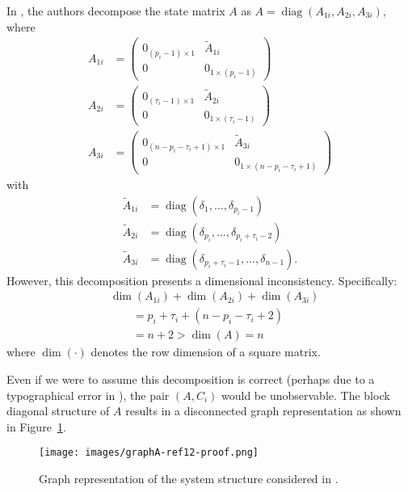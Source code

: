 \documentclass[journal]{IEEEtran}
\newcommand{\diag}{\operatorname{diag}}	%
\begin{document}
In \cite[Appendix C]{Chang2021}, the authors decompose the state matrix $A$ as $A=\diag(A_{1i},A_{2i},A_{3i})$, where
\begin{align*}
    A_{1i} &= \begin{pmatrix}
        0_{(p_i-1)\times 1} & \tilde{A}_{1i} \\ 0 & 0_{1\times (p_i-1)}
    \end{pmatrix} \\
    A_{2i} &= \begin{pmatrix}
        0_{(\tau_i-1)\times 1} & \tilde{A}_{2i} \\ 0 & 0_{1\times(\tau_i-1)}
    \end{pmatrix} \\
    A_{3i} &= \begin{pmatrix}
        0_{(n-p_i-\tau_i+1)\times 1} & \tilde{A}_{3i} \\ 0 & 0_{1\times (n-p_i-\tau_i+1)}
    \end{pmatrix}
\end{align*}
with 
\begin{align*}
    \tilde{A}_{1i} &= \diag(\delta_1,\dots,\delta_{p_i-1}) \\
    \tilde{A}_{2i} &= \diag(\delta_{p_i},\dots,\delta_{p_i+\tau_i-2}) \\
    \tilde{A}_{3i} &= \diag(\delta_{p_i+\tau_i-1},\dots,\delta_{n-1}).
\end{align*}
However, this decomposition presents a dimensional inconsistency. Specifically:
\begin{align*}
&\dim(A_{1i}) + \dim(A_{2i}) + \dim(A_{3i}) \\ &\qquad = p_i + \tau_i + (n-p_i-\tau_i+2) \\
& \qquad = n+2 > \dim(A)=n
\end{align*}
where $\dim(\cdot)$ denotes the row dimension of a square matrix.

Even if we were to assume this decomposition is correct (perhaps due to a typographical error in \cite{Chang2021}), the pair $(A,C_i)$ would be unobservable. The block diagonal structure of $A$ results in a disconnected graph representation as shown in Figure~\ref{fig:graph}.

\begin{figure}
    \centering
    \texttt{[image: images/graphA-ref12-proof.png]}
    \caption{Graph representation of the system structure considered in \cite{Chang2021}.}
    \label{fig:graph}
\end{figure}
\end{document}
